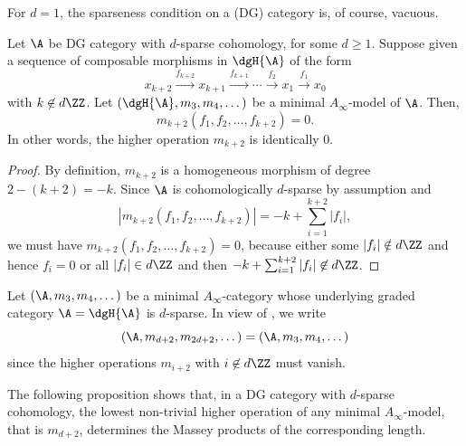 \documentclass[a4paper]{amsart}
\begin{document}
\begin{remark}
  For $d=1$, the sparseness condition on a (DG) category is, of course, vacuous.
\end{remark}

\begin{proposition}
  \label{prop:vanishing_d-sparse}
  Let $\A$ be DG category with $d$-sparse cohomology, for some $d\geq1$. Suppose
  given a sequence of composable morphisms in $\dgH{\A}$ of the form
  \[
    x_{k+2}\xrightarrow{f_{k+2}}x_{k+1}\xrightarrow{f_{k+1}}\cdots\xrightarrow{f_2}x_1\xrightarrow{f_1}x_0
  \]
  with $k\not\in d\ZZ$. Let $(\dgH{\A},m_3,m_4,\dots)$ be a minimal
    $A_\infty$-model of $\A$. Then,
    \[
      m_{k+2}(f_1,f_2,\dots,f_{k+2})=0.
    \]
    In other words, the higher operation $m_{k+2}$ is identically $0$.
\end{proposition}
\begin{proof}
By definition, $m_{k+2}$ is a homogeneous morphism
  of degree $2-(k+2)=-k$. Since $\A$ is cohomologically $d$-sparse by assumption
  and
  \[
    |m_{k+2}(f_1,f_2,\dots,f_{k+2})|=-k+\sum_{i=1}^{k+2}|f_i|,
  \]
  we must have $m_{k+2}(f_1,f_2,\dots,f_{k+2})=0$, because either some
  $|f_i|\notin d\ZZ$ and hence $f_i=0$ or all $|f_i|\in d\ZZ$ and then
  $-k+\sum_{i=1}^{k+2}|f_i|\not\in d\ZZ$.
\end{proof}

\begin{notation}\label{not:sparse_minimal}
  Let $(\A,m_3,m_4,\dots)$ be a minimal $A_\infty$-category whose underlying
  graded category $\A=\dgH{\A}$ is $d$-sparse. In view of
  , we write
  \[
    (\A,m_{d+2},m_{2d+2},\dots)=(\A,m_3,m_4,\dots)
  \]
  since the higher operations $m_{i+2}$ with $i\not\in d\ZZ$ must vanish.
\end{notation}

The following proposition shows that, in a DG category with $d$-sparse
cohomology, the lowest non-trivial higher operation of any minimal
$A_\infty$-model, that is $m_{d+2}$, determines the Massey products of the
corresponding length.
\end{document}

